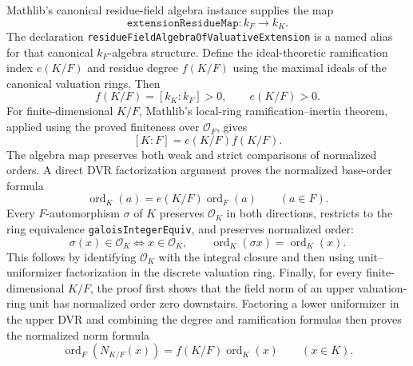 \begin{definition}
Mathlib's canonical residue-field algebra instance supplies the map
\[
 \texttt{extensionResidueMap}:k_F\to k_K.
\]
The declaration \texttt{residueFieldAlgebraOfValuativeExtension} is a named
alias for that canonical $k_F$-algebra structure.  Define the
ideal-theoretic ramification index $e(K/F)$ and residue degree $f(K/F)$
using the maximal ideals of the canonical valuation rings.  Then
\[
 f(K/F)=[k_K:k_F]>0,\qquad e(K/F)>0.
\]
For finite-dimensional $K/F$, Mathlib's local-ring ramification--inertia theorem,
applied using the proved finiteness over $\mathcal O_F$, gives
\[
 [K:F]=e(K/F)f(K/F).
\]
The algebra map preserves both weak and strict comparisons of normalized
orders.  A direct DVR factorization argument proves the normalized
base-order formula
\[
 \operatorname{ord}_K(a)=e(K/F)\operatorname{ord}_F(a)
 \qquad(a\in F).
\]
Every $F$-automorphism $\sigma$ of $K$ preserves $\mathcal O_K$ in both
directions, restricts to the ring equivalence
\texttt{galoisIntegerEquiv}, and preserves normalized order:
\[
 \sigma(x)\in\mathcal O_K\Longleftrightarrow x\in\mathcal O_K,
 \qquad \operatorname{ord}_K(\sigma x)=\operatorname{ord}_K(x).
\]
This follows by identifying $\mathcal O_K$ with the integral closure and then
using unit--uniformizer factorization in the discrete valuation ring.
Finally, for every finite-dimensional $K/F$, the proof first shows that the field
norm of an upper valuation-ring unit has normalized order zero downstairs.
Factoring a lower uniformizer in the upper DVR and combining the degree and
ramification formulas then proves the normalized norm formula
\[
 \operatorname{ord}_F(N_{K/F}(x))
   =f(K/F)\operatorname{ord}_K(x)\qquad(x\in K).
\]

\end{definition}
